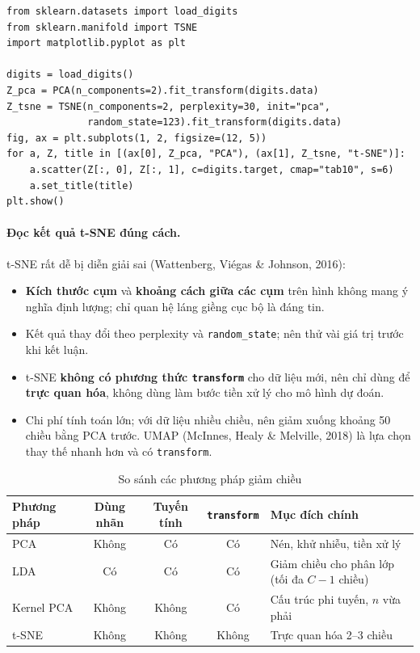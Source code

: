 \begin{lstlisting}[caption={So sánh PCA và t-SNE trên tập chữ số viết tay}]
from sklearn.datasets import load_digits
from sklearn.manifold import TSNE
import matplotlib.pyplot as plt

digits = load_digits()
Z_pca = PCA(n_components=2).fit_transform(digits.data)
Z_tsne = TSNE(n_components=2, perplexity=30, init="pca",
              random_state=123).fit_transform(digits.data)
fig, ax = plt.subplots(1, 2, figsize=(12, 5))
for a, Z, title in [(ax[0], Z_pca, "PCA"), (ax[1], Z_tsne, "t-SNE")]:
    a.scatter(Z[:, 0], Z[:, 1], c=digits.target, cmap="tab10", s=6)
    a.set_title(title)
plt.show()
\end{lstlisting}


\paragraph{Đọc kết quả t-SNE đúng cách.} t-SNE rất dễ bị diễn giải sai (Wattenberg, Viégas \& Johnson, 2016):
\begin{itemize}
    \item \textbf{Kích thước cụm} và \textbf{khoảng cách giữa các cụm} trên hình không mang ý nghĩa định lượng; chỉ quan hệ láng giềng cục bộ là đáng tin.
    \item Kết quả thay đổi theo perplexity và \texttt{random\_state}; nên thử vài giá trị trước khi kết luận.
    \item t-SNE \textbf{không có phương thức \texttt{transform}} cho dữ liệu mới, nên chỉ dùng để \textbf{trực quan hóa}, không dùng làm bước tiền xử lý cho mô hình dự đoán.
    \item Chi phí tính toán lớn; với dữ liệu nhiều chiều, nên giảm xuống khoảng 50 chiều bằng PCA trước. UMAP (McInnes, Healy \& Melville, 2018) là lựa chọn thay thế nhanh hơn và có \texttt{transform}.
\end{itemize}

\begin{table}[H]
\centering
\begin{tabular}{|l|c|c|c|p{4.3cm}|}
\hline
\textbf{Phương pháp} & \textbf{Dùng nhãn} & \textbf{Tuyến tính} & \textbf{\texttt{transform}} & \textbf{Mục đích chính} \\
\hline
PCA & Không & Có & Có & Nén, khử nhiễu, tiền xử lý \\ \hline
LDA & Có & Có & Có & Giảm chiều cho phân lớp (tối đa $C - 1$ chiều) \\ \hline
Kernel PCA & Không & Không & Có & Cấu trúc phi tuyến, $n$ vừa phải \\ \hline
t-SNE & Không & Không & Không & Trực quan hóa 2--3 chiều \\ \hline
\end{tabular}
\caption{So sánh các phương pháp giảm chiều}
\label{tab:dr-compare}
\end{table}

